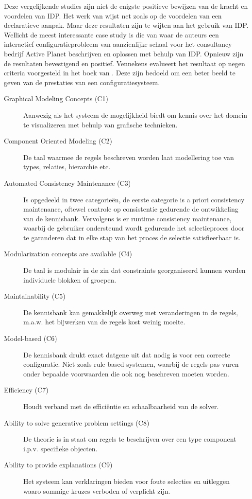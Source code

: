 Deze vergelijkende studies zijn niet de enigste positieve bewijzen van de kracht en voordelen van IDP. Het werk van \citep{vlaeminck2009logical} wijst net zoals \cite{gelle1996interactive} op de voordelen van een declaratieve aanpak. Maar deze resultaten zijn te wijten aan het gebruik van IDP. Wellicht de meest interessante case study is die van \citep{van2016kb} waar de auteurs een interactief configuratieprobleem van aanzienlijke schaal voor het consultancy bedrijf Active Planet beschrijven en oplossen met behulp van IDP. Opnieuw zijn de resultaten bevestigend en positief. Vennekens evalueert het resultaat op negen criteria voorgesteld in het boek van \citep{felfernig2014knowledge}. Deze zijn bedoeld om een beter beeld te geven van de prestaties van een configuratiesysteem. 
\begin{description}
\item[Graphical Modeling Concepts (C1)] Aanwezig als het systeem de mogelijkheid biedt om kennis over het domein te visualizeren met behulp van grafische technieken.
\item[Component Oriented Modeling (C2)] De taal waarmee de regels beschreven worden laat modellering toe van types, relaties, hierarchie etc.
\item[Automated Consistency Maintenance (C3)] Is opgedeeld in twee categorie\"{e}n, de eerste categorie is a priori consistency maintenance, oftewel controle op consistentie gedurende de ontwikkeling van de kennisbank. Vervolgens is er runtime consistency maintenance, waarbij de gebruiker ondersteund wordt gedurende het selectieproces door te garanderen dat in elke stap van het proces de selectie satisfieerbaar is.
\item[Modularization concepts are available (C4)] De taal is modulair in de zin dat constraints georganiseerd kunnen worden individuele blokken of groepen.
\item[Maintainability (C5)] De kennisbank kan gemakkelijk overweg met veranderingen in de regels, m.a.w. het bijwerken van de regels kost weinig moeite. 
\item[Model-based (C6)] De kennisbank drukt exact datgene uit dat nodig is voor een correcte configuratie. Niet zoals rule-based systemen, waarbij de regels pas vuren onder bepaalde voorwaarden die ook nog beschreven moeten worden.
\item[Efficiency (C7)] Houdt verband met de effici\"{e}ntie en schaalbaarheid van de solver.
\item[Ability to solve generative problem settings (C8)] De theorie is in staat om regels te beschrijven over een type component i.p.v. specifieke objecten.
\item[Ability to provide explanations (C9)] Het systeem kan verklaringen bieden voor foute selecties en uitleggen waaro sommige keuzes verboden of verplicht zijn.
\end{description}
